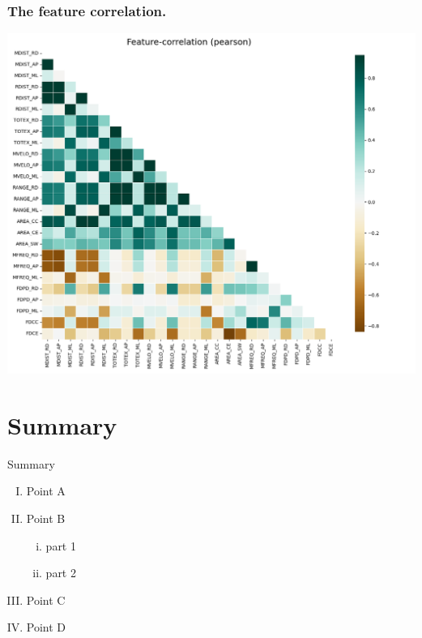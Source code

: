 \documentclass{beamer}
\begin{document}
\begin{frame}
\frametitle{The feature correlation.}
\centering
\includegraphics[scale=0.3]{Manuscripts/src/figures/corr_plot.png}
\end{frame}

\section{Summary}

\begin{frame}{Summary}

\begin{enumerate}[(I)]
\item Point A
\item Point B
\begin{enumerate}[(i)]
\item part 1
\item part 2
\end{enumerate}
\item Point C
\item Point D
\end{enumerate}
    
\end{frame}



\end{document}
